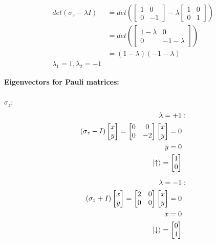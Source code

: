 \documentclass[12pt]{article}
\begin{document}
\begin{equation}
    \begin{split}
        det(\sigma_z - \lambda I) &= det\left(\begin{bmatrix} 1 & 0 \\ 0 & -1 \end{bmatrix} - \lambda \begin{bmatrix} 1 & 0 \\ 0 & 1 \end{bmatrix}\right) \\
        &= det\left(\begin{bmatrix} 1 - \lambda & 0 \\ 0 & - 1 - \lambda \end{bmatrix}\right) \\
        &= (1 - \lambda)(-1 - \lambda) \\
        \lambda_1 = 1, \lambda_2 = -1
    \end{split}
\end{equation}

\newpage
\textbf{Eigenvectors for Pauli matrices:} \\\\
$\sigma_z$:
\begin{equation}
\begin{split}
\lambda = +1 &: \\
(\sigma_z - I)
\begin{bmatrix}
x \\ y
\end{bmatrix}
=
\begin{bmatrix}
0 & 0 \\
0 & -2
\end{bmatrix}
\begin{bmatrix}
x \\ y
\end{bmatrix}
= 0 \\
 y = 0 \\
\ket{\uparrow}
=
\begin{bmatrix}
1 \\ 0
\end{bmatrix}
\\[6pt]
\lambda = -1 &: \\
(\sigma_z + I)
\begin{bmatrix}
x \\ y
\end{bmatrix}
=
\begin{bmatrix}
2 & 0 \\
0 & 0
\end{bmatrix}
\begin{bmatrix}
x \\ y
\end{bmatrix}
= 0 \\
x = 0 \\
\ket{\downarrow}
=
\begin{bmatrix}
0 \\ 1
\end{bmatrix}
\end{split}
\end{equation}
\end{document}
